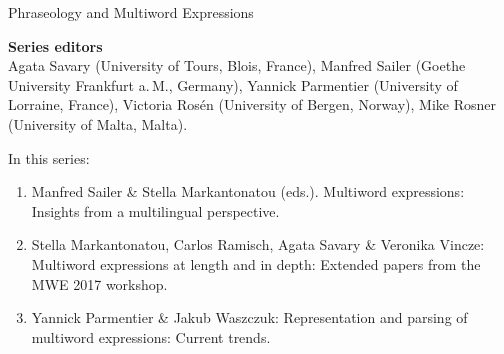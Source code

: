 {\large Phraseology and Multiword Expressions}

\bigskip

\textbf{Series editors}\\
    Agata Savary (University of Tours, Blois, France),
    Manfred Sailer (Goethe University Frankfurt a.\,M., Germany),
    Yannick Parmentier (University of Lorraine, France),
    Victoria Rosén (University of Bergen, Norway),
    Mike Rosner (University of Malta, Malta).

  \bigskip

In this series:

\begin{enumerate}
\item Manfred Sailer \& Stella Markantonatou (eds.). Multiword expressions: Insights from a multilingual perspective.
\item Stella Markantonatou, Carlos Ramisch, Agata Savary \& Veronika Vincze:  Multiword expressions at length and in depth: Extended papers from the MWE 2017 workshop.
\item Yannick Parmentier \& Jakub Waszczuk: Representation and parsing of multiword expressions: Current trends.   
\end{enumerate}


